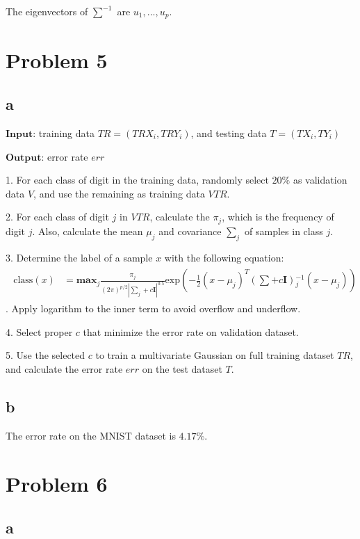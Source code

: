 \documentclass[a4paper,11pt]{article}
\theoremstyle{mytheor}
\begin{document}
The eigenvectors of $\sum^{-1}$ are $u_1, ..., u_p$.

\section*{Problem 5}
\subsection*{a}

$\mathbf{Input}$: training data $TR = (TRX_i, TRY_i)$, and testing data $T = (TX_i, TY_i)$

$\mathbf{Output}$: error rate $err$

1. For each class of digit in the training data, randomly select $20\%$ as validation data $V$, and use the remaining as training data $VTR$.

2. For each class of digit $j$ in $VTR$, calculate the $\pi_j$, which is the frequency of digit $j$. Also, calculate the mean $\mu_j$ and covariance $\sum_{j}$ of samples in class $j$.

3. Determine the label of a sample $x$ with the following equation:
\begin{align}
	\begin{split}
	\text{class}(x) &= \mathbf{max}_{j} \frac{\pi_j}{(2\pi)^{p/2} |\sum_j + c\mathbf{I}|^{0.5}}
	\text{exp}(-\frac{1}{2} (x - \mu_j)^T (\sum + c\mathbf{I})  {}_j^{-1} (x - \mu_j))
	\end{split}
\end{align}.
Apply logarithm to the inner term to avoid overflow and underflow.

4. Select proper $c$ that minimize the error rate on validation dataset.

5. Use the selected $c$ to train a multivariate Gaussian on full training dataset $TR$, and calculate the error rate $err$ on the test dataset $T$.

\subsection*{b}
The error rate on the MNIST dataset is $4.17\%$.

\section*{Problem 6}
\subsection*{a}
\end{document}
